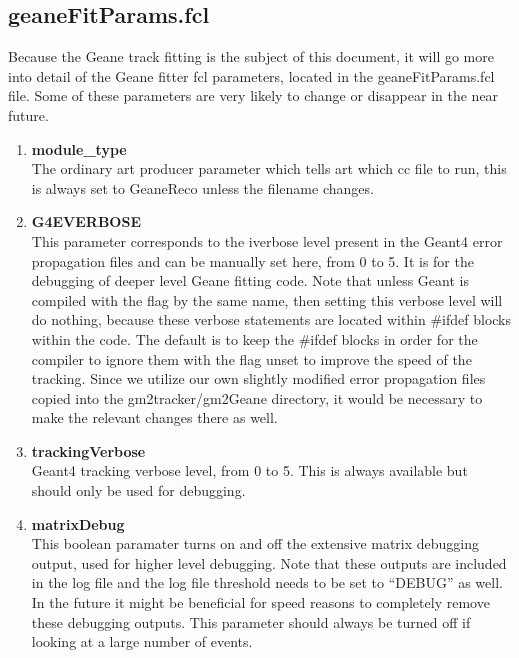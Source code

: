   \subsection{geaneFitParams.fcl}

    Because the Geane track fitting is the subject of this document, it will go more into detail of the Geane fitter fcl parameters, located in the geaneFitParams.fcl file. Some of these parameters are very likely to change or disappear in the near future.

    \begin{enumerate}

      \item{\bf{module\_type}} \\
      The ordinary art producer parameter which tells art which cc file to run, this is always set to GeaneReco unless the filename changes.

      \item{\bf{G4EVERBOSE}} \\
      This parameter corresponds to the iverbose level present in the Geant4 error propagation files and can be manually set here, from 0 to 5. It is for the debugging of deeper level Geane fitting code. Note that unless Geant is compiled with the flag by the same name, then setting this verbose level will do nothing, because these verbose statements are located within \#ifdef blocks within the code. The default is to keep the \#ifdef blocks in order for the compiler to ignore them with the flag unset to improve the speed of the tracking. Since we utilize our own slightly modified error propagation files copied into the gm2tracker/gm2Geane directory, it would be necessary to make the relevant changes there as well.

      \item{\bf{trackingVerbose}} \\
      Geant4 tracking verbose level, from 0 to 5. This is always available but should only be used for debugging.

      \item{\bf{matrixDebug}} \\
      This boolean paramater turns on and off the extensive matrix debugging output, used for higher level debugging. Note that these outputs are included in the log file and the log file threshold needs to be set to ``DEBUG'' as well. In the future it might be beneficial for speed reasons to completely remove these debugging outputs. This parameter should always be turned off if looking at a large number of events.


\end{enumerate}
